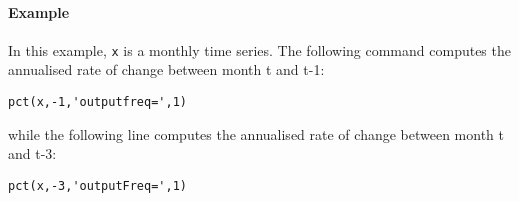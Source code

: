 \paragraph{Example}\label{example}

In this example, \texttt{x} is a monthly time series. The following
command computes the annualised rate of change between month t and t-1:

\begin{verbatim}
pct(x,-1,'outputfreq=',1)
\end{verbatim}

while the following line computes the annualised rate of change between
month t and t-3:

\begin{verbatim}
pct(x,-3,'outputFreq=',1)
\end{verbatim}


